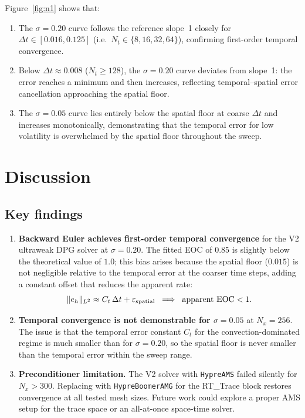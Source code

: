 \documentclass[11pt,a4paper]{article}
\newcommand{\Nx}{N_x}
\newcommand{\Nt}{N_t}
\newcommand{\dt}{\Delta t}
\newcommand{\eps}{\varepsilon}
\begin{document}
Figure~\ref{fig:n1} shows that:
\begin{enumerate}[noitemsep]
\item The $\sigma=0.20$ curve follows the reference slope~1 closely
  for $\dt \in [0.016, 0.125]$ (i.e.\ $\Nt \in \{8,16,32,64\}$),
  confirming first-order temporal convergence.
\item Below $\dt \approx 0.008$ ($\Nt\ge128$), the $\sigma=0.20$
  curve deviates from slope~1: the error reaches a minimum and then
  increases, reflecting temporal--spatial error cancellation
  approaching the spatial floor.
\item The $\sigma=0.05$ curve lies entirely below the spatial floor
  at coarse $\dt$ and increases monotonically, demonstrating that
  the temporal error for low volatility is overwhelmed by the spatial
  floor throughout the sweep.
\end{enumerate}

\section{Discussion}

\subsection{Key findings}

\begin{enumerate}
\item \textbf{Backward Euler achieves first-order temporal convergence}
  for the V2 ultraweak DPG solver at $\sigma=0.20$.
  The fitted EOC of $0.85$ is slightly below the theoretical
  value of $1.0$; this bias arises because the spatial floor
  ($0.015$) is not negligible relative to the temporal error
  at the coarser time steps, adding a constant offset that
  reduces the apparent rate:
  \[
    \|e_h\|_{L^2} \approx C_t\,\dt + \eps_{\rm spatial}
    \;\;\Longrightarrow\;\;
    \text{apparent EOC} < 1.
  \]

\item \textbf{Temporal convergence is not demonstrable for
  $\sigma=0.05$} at $\Nx=256$.  The issue is that the
  temporal error constant $C_t$ for the convection-dominated
  regime is much smaller than for $\sigma=0.20$, so the spatial
  floor is never smaller than the temporal error within the
  sweep range.

\item \textbf{Preconditioner limitation.}  The V2 solver with
  \texttt{HypreAMS} failed silently for $\Nx > 300$.  Replacing
  with \texttt{HypreBoomerAMG} for the RT\_Trace block restores
  convergence at all tested mesh sizes.  Future work could
  explore a proper AMS setup for the trace space or an
  all-at-once space-time solver.
\end{enumerate}
\end{document}
